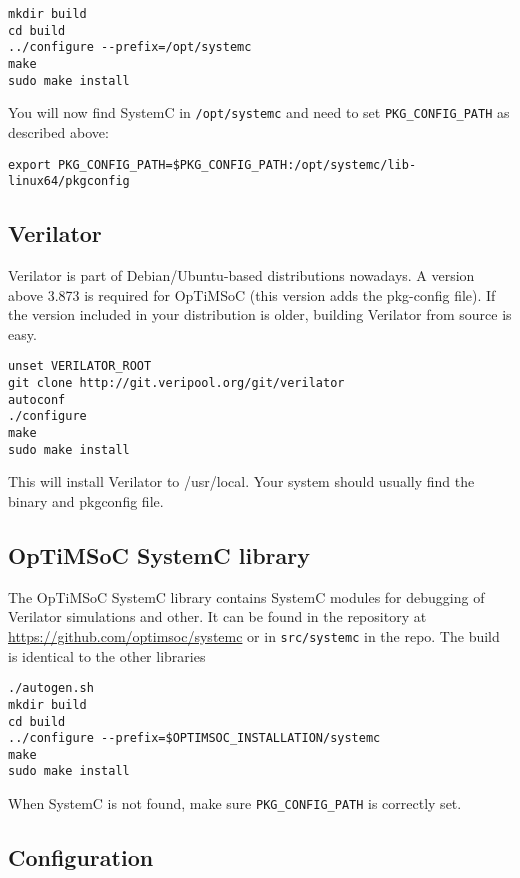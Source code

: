 \begin{lstlisting}
mkdir build
cd build
../configure --prefix=/opt/systemc
make
sudo make install
\end{lstlisting}

You will now find SystemC in \verb|/opt/systemc| and need to set
\verb|PKG_CONFIG_PATH| as described above:

\begin{lstlisting}
export PKG_CONFIG_PATH=$PKG_CONFIG_PATH:/opt/systemc/lib-linux64/pkgconfig
\end{lstlisting}

\subsection{Verilator}

Verilator is part of Debian/Ubuntu-based distributions nowadays. A version
above 3.873 is required for OpTiMSoC (this version adds the pkg-config file).
If the version included in your distribution is older, building Verilator from
source is easy.

\begin{lstlisting}
unset VERILATOR_ROOT
git clone http://git.veripool.org/git/verilator
autoconf
./configure
make
sudo make install
\end{lstlisting}

This will install Verilator to /usr/local. Your system should usually
find the binary and pkgconfig file.

\subsection{OpTiMSoC SystemC library}

The OpTiMSoC SystemC library contains SystemC modules for debugging of
Verilator simulations and other. It can be found in the repository at
\url{https://github.com/optimsoc/systemc} or in \texttt{src/systemc}
in the repo. The build is identical to the other libraries

\begin{lstlisting}
./autogen.sh
mkdir build
cd build
../configure --prefix=$OPTIMSOC_INSTALLATION/systemc
make
sudo make install
\end{lstlisting}

When SystemC is not found, make sure \verb|PKG_CONFIG_PATH| is
correctly set.

\subsection{Configuration}


